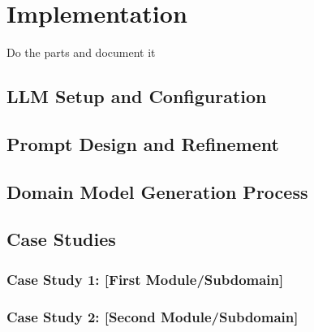 \chapter{Implementation}
Do the parts and document it 
\section{LLM Setup and Configuration}
\section{Prompt Design and Refinement}
\section{Domain Model Generation Process}
\section{Case Studies}
\subsection{Case Study 1: [First Module/Subdomain]}
\subsection{Case Study 2: [Second Module/Subdomain]}